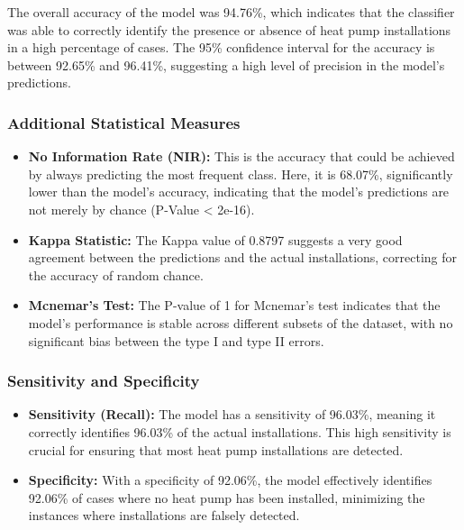 \documentclass[
]{article}
\providecommand{\tightlist}{%
  \setlength{\itemsep}{0pt}\setlength{\parskip}{0pt}}
\begin{document}
The overall accuracy of the model was 94.76\%, which indicates that the classifier was able to correctly identify the presence or absence of heat pump installations in a high percentage of cases. The 95\% confidence interval for the accuracy is between 92.65\% and 96.41\%, suggesting a high level of precision in the model's predictions.

\subsubsection{Additional Statistical Measures}\label{additional-statistical-measures}

\begin{itemize}
\tightlist
\item
  \textbf{No Information Rate (NIR):} This is the accuracy that could be achieved by always predicting the most frequent class. Here, it is 68.07\%, significantly lower than the model's accuracy, indicating that the model's predictions are not merely by chance (P-Value \textless{} 2e-16).
\item
  \textbf{Kappa Statistic:} The Kappa value of 0.8797 suggests a very good agreement between the predictions and the actual installations, correcting for the accuracy of random chance.
\item
  \textbf{Mcnemar's Test:} The P-value of 1 for Mcnemar's test indicates that the model's performance is stable across different subsets of the dataset, with no significant bias between the type I and type II errors.
\end{itemize}

\subsubsection{Sensitivity and Specificity}\label{sensitivity-and-specificity}

\begin{itemize}
\tightlist
\item
  \textbf{Sensitivity (Recall):} The model has a sensitivity of 96.03\%, meaning it correctly identifies 96.03\% of the actual installations. This high sensitivity is crucial for ensuring that most heat pump installations are detected.
\item
  \textbf{Specificity:} With a specificity of 92.06\%, the model effectively identifies 92.06\% of cases where no heat pump has been installed, minimizing the instances where installations are falsely detected.
\end{itemize}
\end{document}

